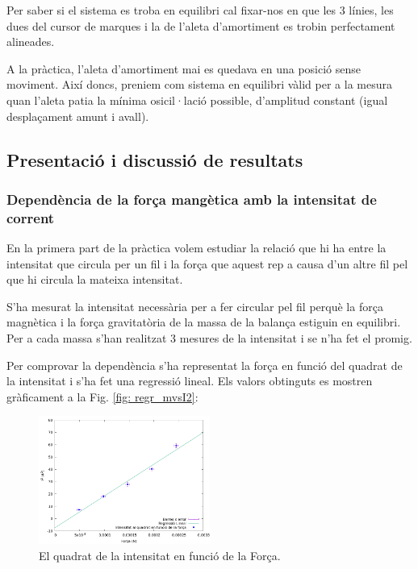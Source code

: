 \documentclass[11pt]{article}
\numberwithin{equation}{section}
\numberwithin{figure}{section}
\numberwithin{table}{section}
\begin{document}

Per saber si el sistema es troba en equilibri cal fixar-nos en que les 3 línies, les dues del cursor de marques i la de l'aleta d'amortiment es trobin perfectament alineades. 

A la pràctica, l'aleta d'amortiment mai es quedava en una posició sense moviment. Així doncs, preniem com sistema en equilibri vàlid per a la mesura quan l'aleta patia la mínima osicil·lació possible, d'amplitud constant (igual desplaçament amunt i avall).

\subsection{Presentació i discussió de resultats}\label{sec: PR2_resultats}

\subsubsection{Dependència de la força mangètica amb la intensitat de corrent}\label{sec: PR2_Fm_intensitat}

En la primera part de la pràctica volem estudiar la relació que hi ha entre la intensitat que circula per un fil i la força que aquest rep a causa d’un altre fil pel que hi circula la mateixa intensitat. 

S’ha mesurat la intensitat necessària per a fer circular pel fil perquè la força magnètica i la força gravitatòria de la massa de la balança estiguin en equilibri. Per a cada massa s’han realitzat 3 mesures de la intensitat i se n’ha fet el promig.

Per comprovar la dependència s’ha representat la força en funció del quadrat de la intensitat i s’ha fet una regressió lineal. Els
valors obtinguts es mostren gràficament a la Fig. \ref{fig: regr_mvsI2}:

\begin{figure}[H]
    \centering
    \includegraphics[width=0.5\textwidth]{PR2_regr_I2vsF.png}
    \caption{El quadrat de la intensitat en funció de la Força.}
    \label{fig: PR2_regr_I2vsF}
\end{figure}
\end{document}

